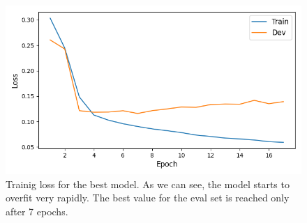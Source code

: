 \documentclass[a4paper]{article}
\begin{document}
\begin{figure}[h]
  \includegraphics[width=\linewidth]{./images/plot_1_loss.png}
  \caption{Trainig loss for the best model. As we can see, the model starts to overfit very rapidly. The best value for the eval set is reached only after 7 epochs.}
  \label{fig:fig1}
\end{figure}





\end{document}
